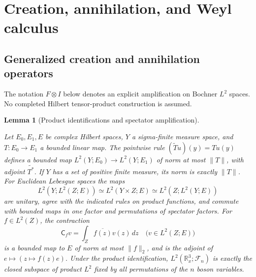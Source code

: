 \documentclass[11pt,a4paper]{article}
\newtheorem{lemma}[theorem]{Lemma}
\theoremstyle{definition}
\theoremstyle{remark}
\newcommand{\proofid}[1]{\par\smallskip{\normalfont\scriptsize\color{inkblue}Stable ID: \nolinkurl{#1}}\par\smallskip}
\begin{document}
\section{Creation, annihilation, and Weyl calculus}
\label{sec:fock-calculus}
\subsection{Generalized creation and annihilation operators}

The notation $F\otimes I$ below denotes an explicit amplification on
Bochner $L^2$ spaces. No completed Hilbert tensor-product construction
is assumed.

\begin{lemma}[Product identifications and spectator amplification]
\label{fock:amplification}
\proofid{fock:amplification}
\par{}\par\smallskip

Let $E_0,E_1,E$ be complex Hilbert spaces, $Y$ a sigma-finite measure space,
and $T:E_0\to E_1$ a bounded linear map. The pointwise rule
$(\widetilde Tu)(y)=Tu(y)$ defines a bounded map
$L^2(Y;E_0)\to L^2(Y;E_1)$ of norm at most $\|T\|$, with adjoint
$\widetilde{T^*}$. If $Y$ has a set of positive finite measure,
its norm is exactly $\|T\|$. For Euclidean Lebesgue spaces the maps
\[
 L^2(Y;L^2(Z;E))\simeq L^2(Y\times Z;E)
                 \simeq L^2(Z;L^2(Y;E))
\]
are unitary, agree with the indicated rules on product functions,
and commute with bounded maps in one factor and permutations of
spectator factors. For $f\in L^2(Z)$, the contraction
\[
 \mathsf C_f v=\int_Z\overline{f(z)}v(z)\,dz
       \quad\big(v\in L^2(Z;E)\big)
\]
is a bounded map to $E$ of norm at most $\|f\|_2$, and is the
adjoint of $e\mapsto(z\mapsto f(z)e)$. Under the product
identification, $L^2(\mathbb R^3_x;\mathcal F_n)$ is exactly the
closed subspace of product $L^2$ fixed by all permutations of the
$n$ boson variables.
\end{lemma}
\end{document}
